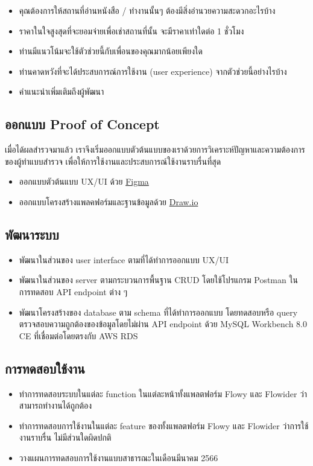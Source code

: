 \begin{enumerate}
\begin{itemize}
        \item คุณต้องการให้สถานที่อ่านหนังสือ / ทำงานนั้นๆ ต้องมีสิ่งอำนวยความสะดวกอะไรบ้าง
        \item ราคาในใจสูงสุดที่จะยอมจ่ายเพื่อเช่าสถานที่นั้น จะมีราคาเท่าใดต่อ 1 ชั่วโมง
        \item ท่านมีแนวโน้มจะใช้ตัวช่วยนี้กับเพื่อนของคุณมากน้อยเพียงใด
        \item ท่านคาดหวังที่จะได้ประสบการณ์การใช้งาน (user experience) จากตัวช่วยนี้อย่างไรบ้าง
        \item คำแนะนำเพิ่มเติมถึงผู้พัฒนา
    \end{itemize}
\end{enumerate}

\subsection{ออกแบบ Proof of Concept}
เมื่อได้ผลสำรวจมาแล้ว เราจึงเริ่มออกแบบตัวต้นแบบของเราด้วยการวิเคราะห์ปัญหาและความต้องการของผู้ทำแบบสำรวจ เพื่อให้การใช้งานและประสบการณ์ใช้งานราบรื่นที่สุด
\begin{itemize}
    \item ออกแบบตัวต้นแบบ UX/UI ด้วย \href{https://www.figma.com/file/y0b4Wo3axU0TD5uoZHBhZM/Flowy?node-id=0-1&t=JYeTFmvNhNrmnj4b-0}{Figma}
    \item ออกแบบโครงสร้างแพลคฟอร์มและฐานข้อมูลด้วย \href{https://app.diagrams.net/#G1SVEf5xnuNXJhE77jdD0Rvaj5KxYkY-5y}{Draw.io}
\end{itemize}

\subsection{พัฒนาระบบ}
\begin{itemize}
    \item พัฒนาในส่วนของ user interface ตามที่ได้ทำการออกแบบ UX/UI
    \item พัฒนาในส่วนของ server ตามกระบวนการพื้นฐาน CRUD โดยใช้โปรแกรม Postman ในการทดสอบ API endpoint ต่าง ๆ
    \item พัฒนาโครงสร้างของ database ตาม schema ที่ได้ทำการออกแบบ โดยทดสอบหรือ query ตรวจสอบความถูกต้องของข้อมูลโดยไม่ผ่าน API endpoint ด้วย MySQL Workbench 8.0 CE ที่เชื่อมต่อโดยตรงกับ AWS RDS
\end{itemize}

\subsection{การทดสอบใช้งาน}
\begin{itemize}
    \item ทำการทดสอบระบบในแต่ละ function ในแต่ละหน้าทั้งแพลตฟอร์ม Flowy และ Flowider ว่าสามารถทำงานได้ถูกต้อง
    \item ทำการทดสอบการใช้งานในแต่ละ feature ของทั้งแพลตฟอร์ม Flowy และ Flowider ว่าการใช้งานราบรื่น ไม่มีส่วนใดผิดปกติ
    \item วางแผนการทดสอบการใช้งานแบบสาธารณะในเดือนมีนาคม 2566
\end{itemize}

